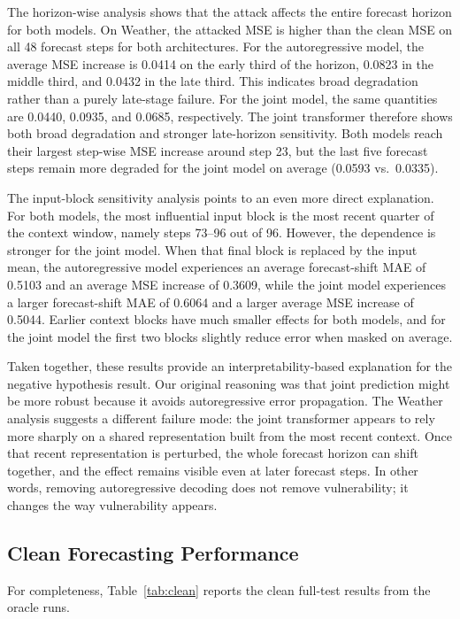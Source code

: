 \documentclass[11pt]{article}
\begin{document}
The horizon-wise analysis shows that the attack affects the entire forecast horizon for both models. On Weather, the attacked MSE is higher than the clean MSE on all 48 forecast steps for both architectures. For the autoregressive model, the average MSE increase is 0.0414 on the early third of the horizon, 0.0823 in the middle third, and 0.0432 in the late third. This indicates broad degradation rather than a purely late-stage failure. For the joint model, the same quantities are 0.0440, 0.0935, and 0.0685, respectively. The joint transformer therefore shows both broad degradation and stronger late-horizon sensitivity. Both models reach their largest step-wise MSE increase around step 23, but the last five forecast steps remain more degraded for the joint model on average (0.0593 vs.\ 0.0335).

The input-block sensitivity analysis points to an even more direct explanation. For both models, the most influential input block is the most recent quarter of the context window, namely steps 73--96 out of 96. However, the dependence is stronger for the joint model. When that final block is replaced by the input mean, the autoregressive model experiences an average forecast-shift MAE of 0.5103 and an average MSE increase of 0.3609, while the joint model experiences a larger forecast-shift MAE of 0.6064 and a larger average MSE increase of 0.5044. Earlier context blocks have much smaller effects for both models, and for the joint model the first two blocks slightly reduce error when masked on average.

Taken together, these results provide an interpretability-based explanation for the negative hypothesis result. Our original reasoning was that joint prediction might be more robust because it avoids autoregressive error propagation. The Weather analysis suggests a different failure mode: the joint transformer appears to rely more sharply on a shared representation built from the most recent context. Once that recent representation is perturbed, the whole forecast horizon can shift together, and the effect remains visible even at later forecast steps. In other words, removing autoregressive decoding does not remove vulnerability; it changes the way vulnerability appears.

\subsection{Clean Forecasting Performance}
For completeness, Table~\ref{tab:clean} reports the clean full-test results from the oracle runs.
\end{document}
